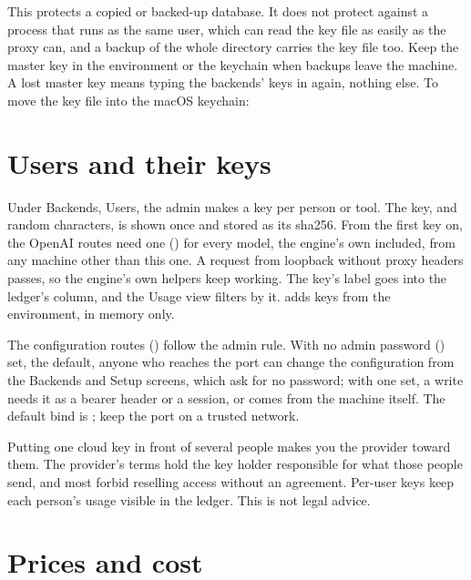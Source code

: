 This protects a copied or backed-up database. It does not protect against a process that runs as the same user, which can read the key file as easily as the proxy can, and a backup of the whole directory carries the key file too. Keep the master key in the environment or the keychain when backups leave the machine. A lost master key means typing the backends' keys in again, nothing else. To move the key file into the macOS keychain:


\section{Users and their keys}

Under Backends, Users, the admin makes a key per person or tool. The key,  and random characters, is shown once and stored as its sha256. From the first key on, the OpenAI routes need one () for every model, the engine's own included, from any machine other than this one. A request from loopback without proxy headers passes, so the engine's own helpers keep working. The key's label goes into the ledger's  column, and the Usage view filters by it.  adds keys from the environment, in memory only.

The configuration routes () follow the admin rule. With no admin password () set, the default, anyone who reaches the port can change the configuration from the Backends and Setup screens, which ask for no password; with one set, a write needs it as a bearer header or a session, or comes from the machine itself. The default bind is ; keep the port on a trusted network.

Putting one cloud key in front of several people makes you the provider toward them. The provider's terms hold the key holder responsible for what those people send, and most forbid reselling access without an agreement. Per-user keys keep each person's usage visible in the ledger. This is not legal advice.

\section{Prices and cost}

